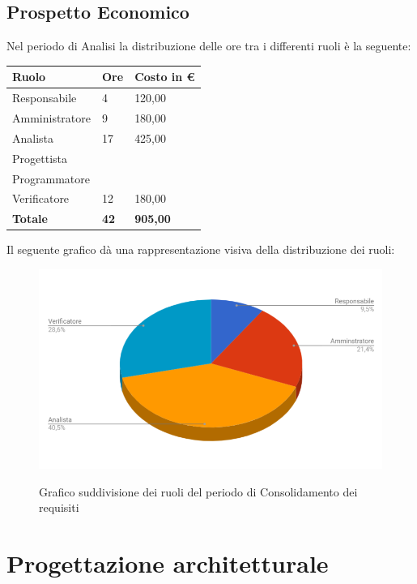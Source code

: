 \documentclass[PianoDiProgetto.tex]{subfiles}
\begin{document}
\subsection{Prospetto Economico}
Nel periodo di Analisi la distribuzione delle ore tra i differenti ruoli è la seguente:
\begin{center}
\begin{table}[htbp]
	\centering
	\renewcommand\arraystretch{1.5}
	\begin{tabularx}{\textwidth}{p{5cm}|p{4cm}|p{4cm}}
		\hline
		\textbf{Ruolo} & \textbf{Ore} & \textbf{Costo in \euro} \\
		\hline
		Responsabile & 4 & 120,00 \\
		\hline
		Amministratore & 9 & 180,00 \\
		\hline
		Analista & 17 & 425,00 \\
		\hline
		Progettista & \ & \ \\
		\hline
		Programmatore & \ & \ \\
		\hline
		Verificatore & 12 & 180,00 \\
		\hline
		\textbf{Totale} & \textbf{42} & \textbf{905,00}\\
		\hline
	\end{tabularx}
\end{table} 
\end{center}
Il seguente grafico dà una rappresentazione visiva della distribuzione dei ruoli:
\begin{figure}[h]
\includegraphics[width=12.5cm]{images/prospettoEconomico/consolidamento.png}
\label{fig:foo}
\caption{Grafico suddivisione dei ruoli del periodo di Consolidamento dei requisiti}
\end{figure} 
\clearpage
\section{Progettazione architetturale}
\end{document}

